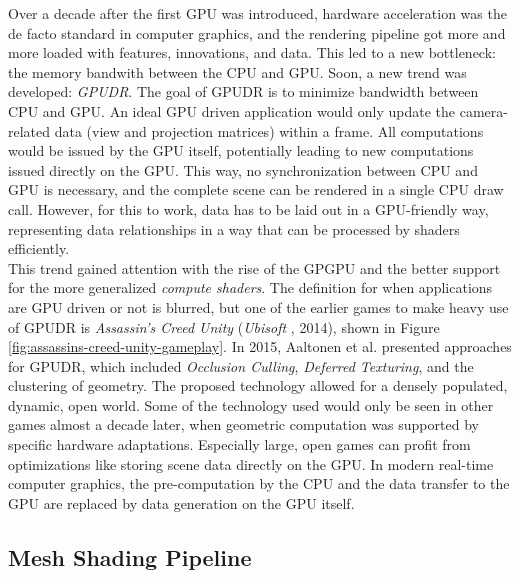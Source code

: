 Over a decade after the first \ac{GPU} was introduced, hardware acceleration was the de facto standard in 
computer graphics, and the rendering pipeline got more and more loaded with features, innovations, and data. 
This led to a new bottleneck: the memory bandwith between the \ac{CPU} and \ac{GPU}. Soon, a new trend was 
developed: \emph{\ac{GPUDR}}. The goal of \ac{GPUDR} is to minimize bandwidth between \ac{CPU} and \ac{GPU}. 
An ideal \ac{GPU} driven application would only update the camera-related data (view and projection matrices) 
within a frame. All computations would be issued by the \ac{GPU} itself, potentially leading to new computations 
issued directly on the \ac{GPU}. This way, no synchronization between \ac{CPU} and \ac{GPU} is necessary, and the 
complete scene can be rendered in a single \ac{CPU} draw call. However, for this to work, data has to be laid out 
in a \ac{GPU}-friendly way, representing data relationships in a way that can be processed by shaders efficiently. \\

\noindent
This trend gained attention with the rise of the \ac{GPGPU} and the better support for the more generalized 
\emph{compute shaders}. The definition for when applications are \ac{GPU} driven or not is blurred, but one 
of the earlier games to make heavy use of \ac{GPUDR} is \emph{Assassin's Creed Unity} (\emph{Ubisoft} 
\cite{Ubisoft2014}, 2014), shown in Figure \ref{fig:assassins-creed-unity-gameplay}. In 2015, Aaltonen et al. 
\cite{Aaltonen2015} presented approaches for \ac{GPUDR}, which included \emph{Occlusion Culling},
\emph{Deferred Texturing}, and the clustering of geometry. The proposed technology allowed for a densely populated, 
dynamic, open world. Some of the technology used would only be seen in other games almost a decade later, when 
geometric computation was supported by specific hardware adaptations. Especially large, open games can profit from 
optimizations like storing scene data directly on the \ac{GPU}. In modern real-time computer graphics, the 
pre-computation by the \ac{CPU} and the data transfer to the \ac{GPU} are replaced by data generation on the 
\ac{GPU} itself.

\subsection*{Mesh Shading Pipeline} \label{subsec-mesh-shading-pipeline}


